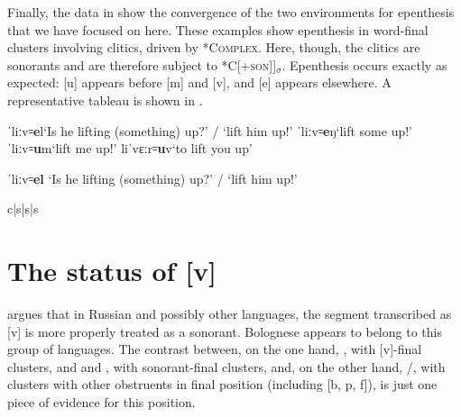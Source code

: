 \documentclass[output=paper,colorlinks,citecolor=brown]{langscibook}
\begin{document}
Finally, the data in  show the convergence of the two environments for epenthesis that we have focused on here.  These examples show epenthesis in word-final clusters involving clitics, driven by \textsc{*Complex}.  Here, though, the clitics are sonorants and are therefore subject to \textsc{*C[+son]]$_\sigma$}.  Epenthesis occurs exactly as expected: [u] appears before [m] and [v], and [e] appears elsewhere.  A representative tableau is shown in .

\begin{exe}
    \ex \label{sonorantclitics}
        \begin{xlist}
            \ex ˈliːv꞊\textbf{e}l\tab `Is he lifting (something) up?' / `lift him up!'
            \ex ˈliːv꞊\textbf{e}ŋ\tab `lift some up!'
            \ex ˈliːv꞊\textbf{u}m\tab `lift me up!'
            \ex liˈvɛːr꞊\textbf{u}v\tab `to lift you up'
        \end{xlist}
\end{exe}


\begin{table}
\caption{ˈliːv꞊\textbf{el} `Is he lifting (something) up?' / `lift him up!'}
\label{lifting}
\ShadingOn
\begin{tableau}{c|s|s|s} 
      \const*{\textsc{*C[+son]]$_\sigma$}}    
               \vio{*!}     \vio{}  \vio{*}    \vio{}
    \vio{}      \vio{}  \vio{}     \vio{*}
\end{tableau}
\end{table}



\section{The status of [v]}\label{vsonorant}
\citet{padgett:v} argues that in Russian and possibly other languages, the segment transcribed as [v] is more properly treated as a sonorant.  Bolognese appears to belong to this group of languages.  The contrast between, on the one hand, , with [v]-final clusters, and  and , with sonorant-final clusters, and, on the other hand, /, with clusters with other obstruents in final position (including [b, p, f]), is just one piece of evidence for this position. %
\end{document}
